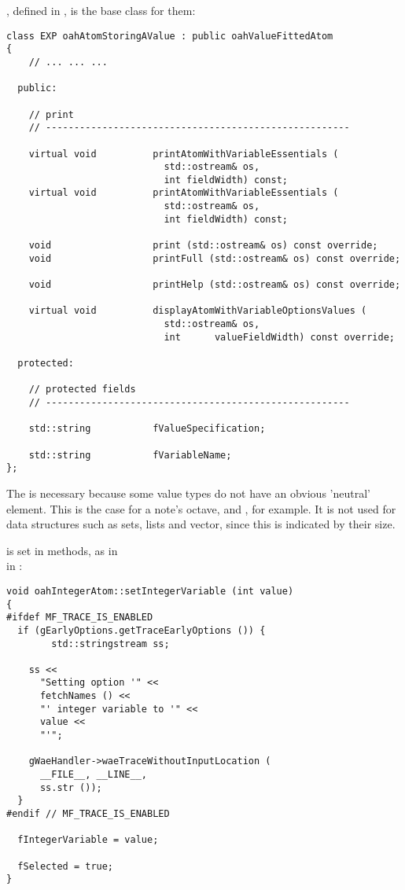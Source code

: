 , defined in , is the base class   for them:
\begin{lstlisting}[language=CPlusPlus]
class EXP oahAtomStoringAValue : public oahValueFittedAtom
{
	// ... ... ...

  public:

    // print
    // ------------------------------------------------------

    virtual void          printAtomWithVariableEssentials (
                            std::ostream& os,
                            int fieldWidth) const;
    virtual void          printAtomWithVariableEssentials (
                            std::ostream& os,
                            int fieldWidth) const;

    void                  print (std::ostream& os) const override;
    void                  printFull (std::ostream& os) const override;

    void                  printHelp (std::ostream& os) const override;

    virtual void          displayAtomWithVariableOptionsValues (
                            std::ostream& os,
                            int      valueFieldWidth) const override;

  protected:

    // protected fields
    // ------------------------------------------------------

    std::string           fValueSpecification;

    std::string           fVariableName;
};
\end{lstlisting}

The  is necessary because some value types do not have an obvious 'neutral' element. This is the case for a note's octave,  and , for example. It is not used for data structures such as sets, lists and vector, since this is indicated by their size.

 is set in  methods, as in \\
in :
\begin{lstlisting}[language=CPlusPlus]
void oahIntegerAtom::setIntegerVariable (int value)
{
#ifdef MF_TRACE_IS_ENABLED
  if (gEarlyOptions.getTraceEarlyOptions ()) {
		std::stringstream ss;

    ss <<
      "Setting option '" <<
      fetchNames () <<
      "' integer variable to '" <<
      value <<
      "'";

    gWaeHandler->waeTraceWithoutInputLocation (
      __FILE__, __LINE__,
      ss.str ());
  }
#endif // MF_TRACE_IS_ENABLED

  fIntegerVariable = value;

  fSelected = true;
}
\end{lstlisting}


